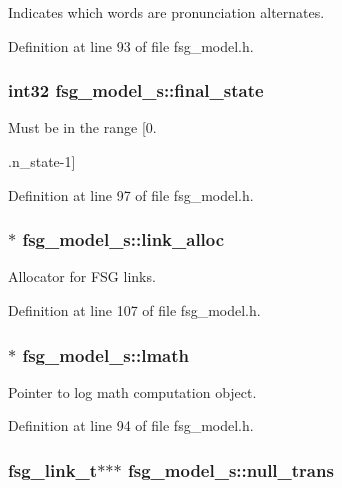 Indicates which words are pronunciation alternates. 



Definition at line 93 of file fsg\_\-model.h.
\subsubsection[{final\_\-state}]{\setlength{\rightskip}{0pt plus 5cm}int32 {\bf fsg\_\-model\_\-s::final\_\-state}}\label{structfsg__model__s_da19c76db4f1fc89c8b5cd674ec865da}


Must be in the range [0. 

.n\_\-state-1] 

Definition at line 97 of file fsg\_\-model.h.
\subsubsection[{link\_\-alloc}]{$\ast$ {\bf fsg\_\-model\_\-s::link\_\-alloc}}\label{structfsg__model__s_c4e2a36305bbe62a5c7468588eb058b1}


Allocator for FSG links. 



Definition at line 107 of file fsg\_\-model.h.
\subsubsection[{lmath}]{$\ast$ {\bf fsg\_\-model\_\-s::lmath}}\label{structfsg__model__s_b0b22dadb593ee1901829f89c4a47fe2}


Pointer to log math computation object. 



Definition at line 94 of file fsg\_\-model.h.
\subsubsection[{null\_\-trans}]{\setlength{\rightskip}{0pt plus 5cm}fsg\_\-link\_\-t$\ast$$\ast$$\ast$ {\bf fsg\_\-model\_\-s::null\_\-trans}}\label{structfsg__model__s_65161ba6859bcab943485ed5e3b06891}


